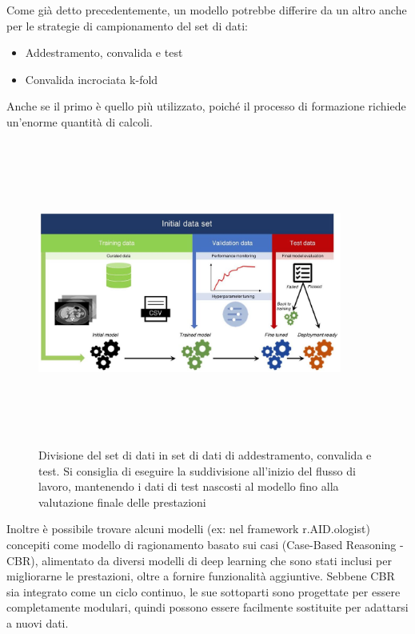 \documentclass[12pt,a4paper]{report}
\begin{document}
Come già detto precedentemente, un modello potrebbe differire da un altro anche per le strategie di campionamento del set di dati:
\begin{itemize}
    \item Addestramento, convalida e test
    \item Convalida incrociata k-fold
\end{itemize}
Anche se il primo è quello più utilizzato, poiché il processo di formazione richiede un'enorme quantità di calcoli.\\

\begin{figure}[h!]
    \begin{center}
        \includegraphics[width=10cm,height=10cm,keepaspectratio]{Data_radiology}
    \end{center}
    \caption{Divisione del set di dati in set di dati di addestramento, convalida e test. Si consiglia di eseguire la suddivisione all'inizio del flusso di lavoro, mantenendo i dati di test nascosti al modello fino alla valutazione finale delle prestazioni}
    \label{fig:data-sampling}
\end{figure}



Inoltre è possibile trovare alcuni modelli (ex: nel framework r.AID.ologist) concepiti come modello di ragionamento basato sui casi (Case-Based Reasoning - CBR), alimentato da diversi modelli di deep learning che sono stati inclusi per migliorarne le prestazioni, oltre a fornire funzionalità aggiuntive.
Sebbene CBR sia integrato come un ciclo continuo, le sue sottoparti sono progettate per essere completamente modulari, quindi possono essere facilmente sostituite per adattarsi a nuovi dati.
\end{document}
